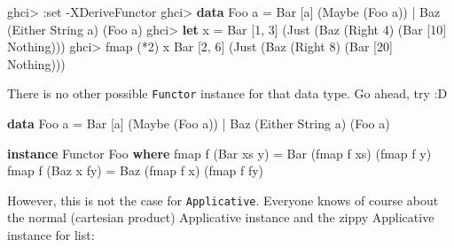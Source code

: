 \documentclass[]{article}
\newenvironment{Shaded}{\begin{snugshade}}{\end{snugshade}}
\newcommand{\DataTypeTok}[1]{\textcolor[rgb]{0.13,0.29,0.53}{#1}}
\newcommand{\DecValTok}[1]{\textcolor[rgb]{0.00,0.00,0.81}{#1}}
\newcommand{\FunctionTok}[1]{\textcolor[rgb]{0.00,0.00,0.00}{#1}}
\newcommand{\KeywordTok}[1]{\textcolor[rgb]{0.13,0.29,0.53}{\textbf{#1}}}
\newcommand{\NormalTok}[1]{#1}
\begin{document}
\begin{Shaded}
\begin{Highlighting}[]
\NormalTok{ghci}\FunctionTok{>} \FunctionTok{:}\NormalTok{set }\FunctionTok{-}\DataTypeTok{XDeriveFunctor}
\NormalTok{ghci}\FunctionTok{>} \KeywordTok{data} \DataTypeTok{Foo}\NormalTok{ a }\FunctionTok{=} \DataTypeTok{Bar}\NormalTok{ [a] (}\DataTypeTok{Maybe}\NormalTok{ (}\DataTypeTok{Foo}\NormalTok{ a)) }\FunctionTok{|} \DataTypeTok{Baz}\NormalTok{ (}\DataTypeTok{Either} \DataTypeTok{String}\NormalTok{ a) (}\DataTypeTok{Foo}\NormalTok{ a)}
\NormalTok{ghci}\FunctionTok{>} \KeywordTok{let}\NormalTok{ x }\FunctionTok{=} \DataTypeTok{Bar}\NormalTok{ [}\DecValTok{1}\NormalTok{, }\DecValTok{3}\NormalTok{] (}\DataTypeTok{Just}\NormalTok{ (}\DataTypeTok{Baz}\NormalTok{ (}\DataTypeTok{Right} \DecValTok{4}\NormalTok{) (}\DataTypeTok{Bar}\NormalTok{ [}\DecValTok{10}\NormalTok{] }\DataTypeTok{Nothing}\NormalTok{)))}
\NormalTok{ghci}\FunctionTok{>}\NormalTok{ fmap (}\FunctionTok{*}\DecValTok{2}\NormalTok{) x}
\DataTypeTok{Bar}\NormalTok{ [}\DecValTok{2}\NormalTok{, }\DecValTok{6}\NormalTok{] (}\DataTypeTok{Just}\NormalTok{ (}\DataTypeTok{Baz}\NormalTok{ (}\DataTypeTok{Right} \DecValTok{8}\NormalTok{) (}\DataTypeTok{Bar}\NormalTok{ [}\DecValTok{20}\NormalTok{] }\DataTypeTok{Nothing}\NormalTok{)))}
\end{Highlighting}
\end{Shaded}

There is no other possible \texttt{Functor} instance for that data type. Go
ahead, try :D

\begin{Shaded}
\begin{Highlighting}[]
\KeywordTok{data} \DataTypeTok{Foo}\NormalTok{ a }\FunctionTok{=} \DataTypeTok{Bar}\NormalTok{ [a] (}\DataTypeTok{Maybe}\NormalTok{ (}\DataTypeTok{Foo}\NormalTok{ a)) }\FunctionTok{|} \DataTypeTok{Baz}\NormalTok{ (}\DataTypeTok{Either} \DataTypeTok{String}\NormalTok{ a) (}\DataTypeTok{Foo}\NormalTok{ a)}

\KeywordTok{instance} \DataTypeTok{Functor} \DataTypeTok{Foo} \KeywordTok{where}
\NormalTok{    fmap f (}\DataTypeTok{Bar}\NormalTok{ xs y) }\FunctionTok{=} \DataTypeTok{Bar}\NormalTok{ (fmap f xs) (fmap f y)}
\NormalTok{    fmap f (}\DataTypeTok{Baz}\NormalTok{ x fy) }\FunctionTok{=} \DataTypeTok{Baz}\NormalTok{ (fmap f x) (fmap f fy)}
\end{Highlighting}
\end{Shaded}

However, this is not the case for \texttt{Applicative}. Everyone knows of course
about the normal (cartesian product) Applicative instance and the zippy
Applicative instance for list:
\end{document}
